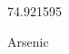 \documentclass[12pt]{article}
\begin{document}
\hfill{}
\vfill
\begin{center}
  {\fontsize{50}{60}
  }

  74.921595

Arsenic
\end{center}
\vfill
\end{document}

